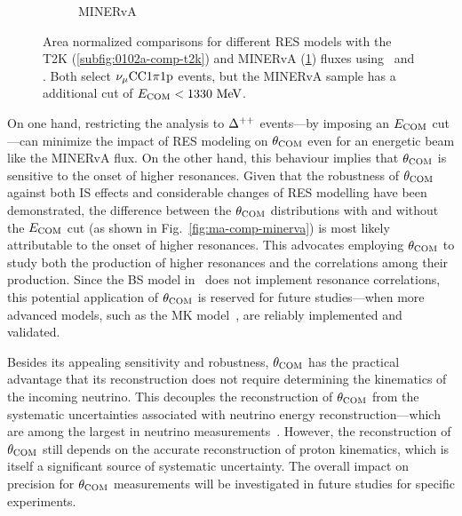 \begin{figure}
\begin{subfigure}[b]{\dbfigwid\textwidth}
          \caption{MINERvA}
          \label{subfig:0102a-comp-minerva}
     \end{subfigure}
     \caption{Area normalized comparisons for different RES models with the T2K (\ref{subfig:0102a-comp-t2k}) and MINERvA (\ref{subfig:0102a-comp-minerva}) fluxes using \geoa\ and \getwoa.
     Both select $\nu_{\mu}\textrm{CC}1\pi1\textrm{p}$ events, but the MINERvA sample has a additional cut of $E_{\textrm{COM}}<1330~\textrm{MeV}$.}
     \label{fig:0102a-comp}
     \end{figure}

     On one hand, restricting the analysis to $\Delta^{++}$ events—by imposing an $E_{\textrm{COM}}$ cut—can minimize the impact of RES modeling on $\theta_{\textrm{COM}}$ even for an energetic beam like the MINERvA flux.
     On the other hand, this behaviour implies that $\theta_{\textrm{COM}}$ is sensitive to the onset of higher resonances.
     Given that the robustness of $\theta_{\textrm{COM}}$ against both IS effects and considerable changes of RES modelling have been demonstrated, the difference between the $\theta_{\textrm{COM}}$ distributions with and without the $E_{\textrm{COM}}$ cut (as shown in Fig.~\ref{fig:ma-comp-minerva}) is most likely attributable to the onset of higher resonances.
     This advocates employing $\theta_{\textrm{COM}}$ to study both the production of higher resonances and the correlations among their production.
     Since the BS model in \genie\ does not implement resonance correlations, this potential application of $\theta_{\textrm{COM}}$ is reserved for future studies—when more advanced models, such as the MK model~\cite{Kabirnezhad:2017jmf,Kabirnezhad:2020wtp,Kabirnezhad:2022znc}, are reliably implemented and validated.

     Besides its appealing sensitivity and robustness, $\theta_{\textrm{COM}}$ has the practical advantage that its reconstruction does not require determining the kinematics of the incoming neutrino.
     This decouples the reconstruction of $\theta_{\textrm{COM}}$ from the systematic uncertainties associated with neutrino energy reconstruction—which are among the largest in neutrino measurements~\cite{T2K:2019yqu,T2K:2021naz,MicroBooNECollaboration:2024gvg,NOvA:2023uxq,MINERvA:2022djk}.
     However, the reconstruction of $\theta_{\textrm{COM}}$ still depends on the accurate reconstruction of proton kinematics, which is itself a significant source of systematic uncertainty.
     The overall impact on precision for $\theta_{\textrm{COM}}$ measurements will be investigated in future studies for specific experiments.


